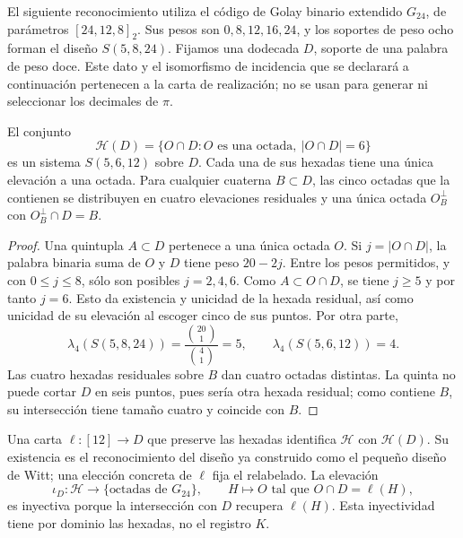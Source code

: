 El siguiente reconocimiento utiliza el código de Golay binario
extendido $G_{24}$, de parámetros $[24,12,8]_2$. Sus pesos son
$0,8,12,16,24$, y los soportes de peso ocho forman el diseño
$S(5,8,24)$. Fijamos una dodecada $D$, soporte de una palabra de peso
doce. Este dato y el isomorfismo de incidencia que se declarará a
continuación pertenecen a la carta de realización; no se usan para
generar ni seleccionar los decimales de $\pi$.

\begin{proposition}
\label{exc:residuo-binario}
El conjunto
\[
 \mathcal H(D)=
 \{O\cap D: O\text{ es una octada},\ |O\cap D|=6\}
\]
es un sistema $S(5,6,12)$ sobre $D$. Cada una de sus hexadas tiene
una única elevación a una octada. Para cualquier cuaterna $B\subset D$,
las cinco octadas que la contienen se distribuyen en cuatro elevaciones
residuales y una única octada $O_B^\perp$ con $O_B^\perp\cap D=B$.
\end{proposition}

\begin{proof}
Una quintupla $A\subset D$ pertenece a una única octada $O$. Si
$j=|O\cap D|$, la palabra binaria suma de $O$ y $D$ tiene peso
$20-2j$. Entre los pesos permitidos, y con $0\leq j\leq8$, sólo
son posibles $j=2,4,6$. Como $A\subset O\cap D$, se tiene $j\geq5$
y por tanto $j=6$. Esto da existencia y unicidad de la hexada
residual, así como unicidad de su elevación al escoger cinco de sus
puntos. Por otra parte,
\[
 \lambda_4(S(5,8,24))=\frac{\binom{20}1}{\binom41}=5,
 \qquad
 \lambda_4(S(5,6,12))=4.
\]
Las cuatro hexadas residuales sobre $B$ dan cuatro octadas distintas.
La quinta no puede cortar $D$ en seis puntos, pues sería otra hexada
residual; como contiene $B$, su intersección tiene tamaño cuatro y
coincide con $B$.
\end{proof}

Una carta $\ell:[12]\to D$ que preserve las hexadas identifica
$\mathcal H$ con $\mathcal H(D)$. Su existencia es el reconocimiento
del diseño ya construido como el pequeño diseño de Witt; una elección
concreta de $\ell$ fija el relabelado. La elevación
\[
 \iota_D:\mathcal H\longrightarrow
       \{\text{octadas de }G_{24}\},
 \qquad H\longmapsto O\text{ tal que }O\cap D=\ell(H),
\]
es inyectiva porque la intersección con $D$ recupera $\ell(H)$.
Esta inyectividad tiene por dominio las hexadas, no el registro $K$.

